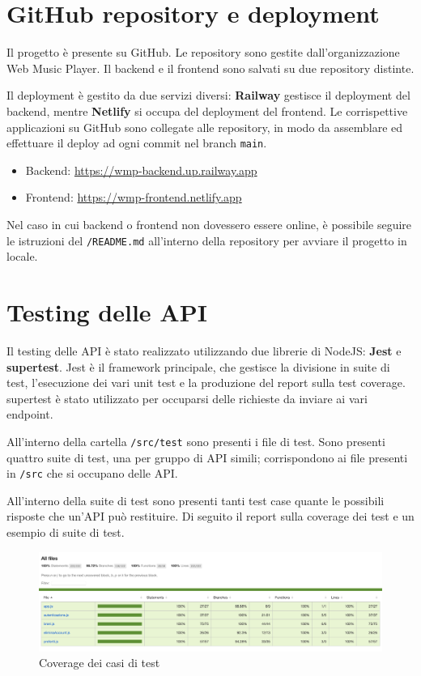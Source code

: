 \documentclass[a4paper,12pt]{article}
\begin{document}
\newpage
\section{GitHub repository e deployment}

Il progetto è presente su GitHub. Le repository sono gestite dall'organizzazione Web Music Player. Il backend e il frontend sono salvati su due repository distinte.

Il deployment è gestito da due servizi diversi: \textbf{Railway} gestisce il deployment del backend, mentre \textbf{Netlify} si occupa del deployment del frontend. Le corrispettive applicazioni su GitHub sono collegate alle repository, in modo da assemblare ed effettuare il deploy ad ogni commit nel branch \texttt{main}.

\begin{itemize}
    \item Backend: \href{https://wmp-backend.up.railway.app}{https://wmp-backend.up.railway.app}
    \item Frontend: \href{https://wmp-frontend.netlify.app}{https://wmp-frontend.netlify.app}
\end{itemize}

Nel caso in cui backend o frontend non dovessero essere online, è possibile seguire le istruzioni del \texttt{/README.md} all'interno della repository per avviare il progetto in locale.

\newpage
\section{Testing delle API}

Il testing delle API è stato realizzato utilizzando due librerie di NodeJS: \textbf{Jest} e \textbf{supertest}. Jest è il framework principale, che gestisce la divisione in suite di test, l'esecuzione dei vari unit test e la produzione del report sulla test coverage. supertest è stato utilizzato per occuparsi delle richieste da inviare ai vari endpoint.

All'interno della cartella \texttt{/src/test} sono presenti i file di test. Sono presenti quattro suite di test, una per gruppo di API simili; corrispondono ai file presenti in \texttt{/src} che si occupano delle API.

All'interno della suite di test sono presenti tanti test case quante le possibili risposte che un'API può restituire. Di seguito il report sulla coverage dei test e un esempio di suite di test.

\begin{figure}[htp]
    \centering
    \includegraphics[width=\textwidth]{code/coverage.png}
    \caption{Coverage dei casi di test}
\end{figure}
\end{document}
